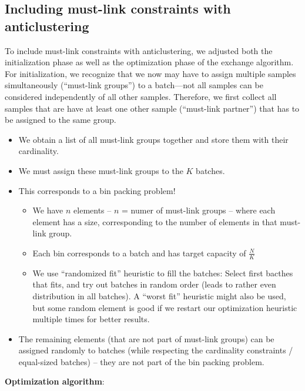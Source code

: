 \documentclass[
]{article}
\providecommand{\tightlist}{%
  \setlength{\itemsep}{0pt}\setlength{\parskip}{0pt}}
\begin{document}
\subsection{Including must-link constraints with
anticlustering}\label{including-must-link-constraints-with-anticlustering}

To include must-link constraints with anticlustering, we adjusted both
the initialization phase as well as the optimization phase of the
exchange algorithm. For initialization, we recognize that we now may
have to assign multiple samples simultaneously (``must-link groups'') to
a batch---not all samples can be considered independently of all other
samples. Therefore, we first collect all samples that are have at least
one other sample (``must-link partner'') that has to be assigned to the
same group.

\begin{itemize}
\tightlist
\item
  We obtain a list of all must-link groups together and store them with
  their cardinality.
\item
  We must assign these must-link groups to the \(K\) batches.
\item
  This corresponds to a bin packing problem!

  \begin{itemize}
  \tightlist
  \item
    We have \(n\) elements -- \(n\) = numer of must-link groups -- where
    each element has a size, corresponding to the number of elements in
    that must-link group.
  \item
    Each bin corresponds to a batch and has target capacity of
    \(\frac{N}{K}\)
  \item
    We use ``randomized fit'' heuristic to fill the batches: Select
    first bacthes that fits, and try out batches in random order (leads
    to rather even distribution in all batches). A ``worst fit''
    heuristic might also be used, but some random element is good if we
    restart our optimization heuristic multiple times for better
    results.
  \end{itemize}
\item
  The remaining elements (that are not part of must-link groups) can be
  assigned randomly to batches (while respecting the cardinality
  constraints / equal-sized batches) -- they are not part of the bin
  packing problem.
\end{itemize}

\textbf{Optimization algorithm}:
\end{document}
